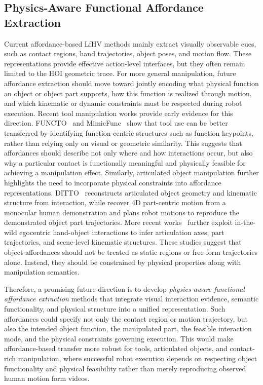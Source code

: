 \documentclass[Afour,sageh,times]{sagej}
\begin{document}
\subsection{Physics-Aware Functional Affordance Extraction}

Current affordance-based LfHV methods mainly extract visually observable cues, such as contact regions, hand trajectories, object poses, and motion flow. These representations provide effective action-level interfaces, but they often remain limited to the HOI geometric trace. For more general manipulation, future affordance extraction should move toward jointly encoding what physical function an object or object part supports, how this function is realized through motion, and which kinematic or dynamic constraints must be respected during robot execution. Recent tool manipulation works provide early evidence for this direction. FUNCTO~\citep{tang2025functo} and MimicFunc~\citep{tang2025mimicfunc} show that tool use can be better transferred by identifying function-centric structures such as function keypoints, rather than relying only on visual or geometric similarity. This suggests that affordances should describe not only where and how interactions occur, but also why a particular contact is functionally meaningful and physically feasible for achieving a manipulation effect. Similarly, articulated object manipulation further highlights the need to incorporate physical constraints into affordance representations. DITTO~\citep{jiang2022ditto} reconstructs articulated object geometry and kinematic structure from interaction, while \cite{kerr2024robot} recover 4D part-centric motion from a monocular human demonstration and plans robot motions to reproduce the demonstrated object part trajectories. More recent works~\citep{werby2025articulated,wang2026paws} further exploit in-the-wild egocentric hand-object interactions to infer articulation axes, part trajectories, and scene-level kinematic structures. These studies suggest that object affordances should not be treated as static regions or free-form trajectories alone. Instead, they should be constrained by physical properties along with manipulation semantics.

Therefore, a promising future direction is to develop \textit{physics-aware functional affordance extraction} methods that integrate visual interaction evidence, semantic functionality, and physical structure into a unified representation. Such affordances could specify not only the contact region or motion trajectory, but also the intended object function, the manipulated part, the feasible interaction mode, and the physical constraints governing execution. This would make affordance-based transfer more robust for tools, articulated objects, and contact-rich manipulation, where successful robot execution depends on respecting object functionality and physical feasibility rather than merely reproducing observed human motion form videos.
\end{document}
